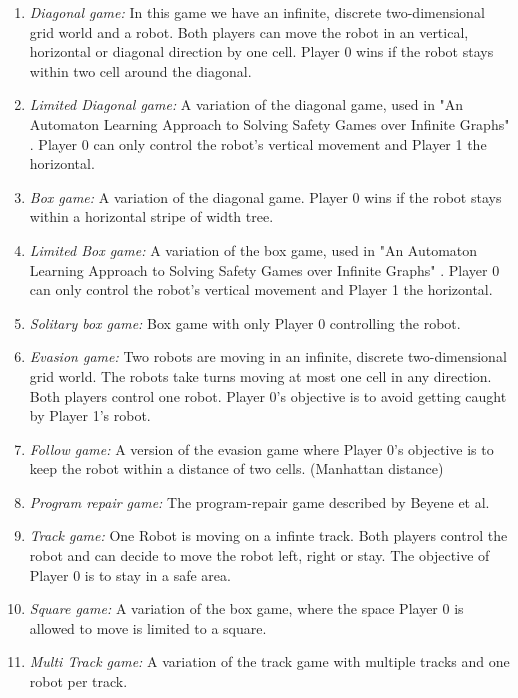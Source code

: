 \documentclass[10pt,a4paper]{article}
\theoremstyle{plain}
\theoremstyle{definition}
\begin{document}
\begin{enumerate}
\item \emph{Diagonal game:} In this game we have an infinite, discrete two-dimensional grid world and a robot. Both players can move the robot in an vertical, horizontal or diagonal direction by one cell. Player 0 wins if the robot stays within two cell around the diagonal.
\item \emph{Limited Diagonal game:} A variation of the diagonal game, used in "An Automaton Learning Approach to Solving Safety Games over Infinite Graphs" \cite{neider2016automaton}. Player 0 can only control the robot's vertical movement and Player 1 the horizontal.
\item \emph{Box game:} A variation of the diagonal game. Player 0 wins if the robot stays within a horizontal stripe of width tree.
\item \emph{Limited Box game:} A variation of the box game, used in "An Automaton Learning Approach to Solving Safety Games over Infinite Graphs" \cite{neider2016automaton}. Player 0 can only control the robot's vertical movement and Player 1 the horizontal.
\item \emph{Solitary box game:} Box game with only Player 0 controlling the robot.
\item \emph{Evasion game:} Two robots are moving in an infinite, discrete two-dimensional grid world. The robots take turns moving at most one cell in any direction. Both players control one robot. Player 0's objective is to avoid getting caught by Player 1's robot.
\item \emph{Follow game:} A version of the evasion game where Player 0's objective is to keep the robot within a distance of two cells. (Manhattan distance)
\item \emph{Program repair game:} The program-repair game described by Beyene et al. \cite{beyene2014constraint}
\item \emph{Track game:} One Robot is moving on a infinte track. Both players control the robot and can decide to move the robot left, right or stay. The objective of Player 0 is to stay in a safe area.
\item \emph{Square game:} A variation of the box game, where the space Player 0 is allowed to move is limited to a square.
\item \emph{Multi Track game:} A variation of the track game with multiple tracks and one robot per track.
\end{enumerate}
\end{document}
